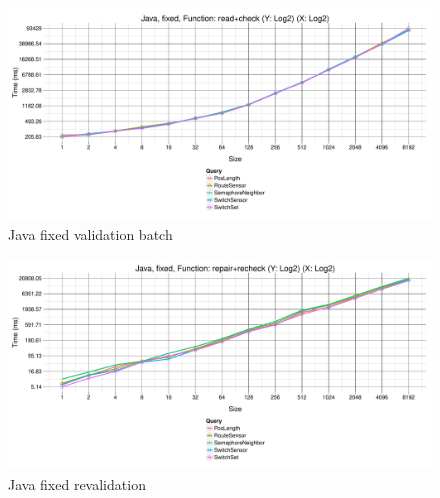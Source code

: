 \begin{figure}[h!tb]
  \centering
  \includegraphics[width=\textwidth]{figures/fixed-Java-GroupBy-Query-time-batch-validation.pdf}
  \caption{Java fixed validation batch}
  \label{fig:JavaFixedValidationBatch}
\end{figure}

\begin{figure}[h!tb]
  \centering
  \includegraphics[width=\textwidth]{figures/fixed-Java-GroupBy-Query-time-revalidation.pdf}
  \caption{Java fixed revalidation}
  \label{fig:JavaFixedReValidationBatch}
\end{figure}
